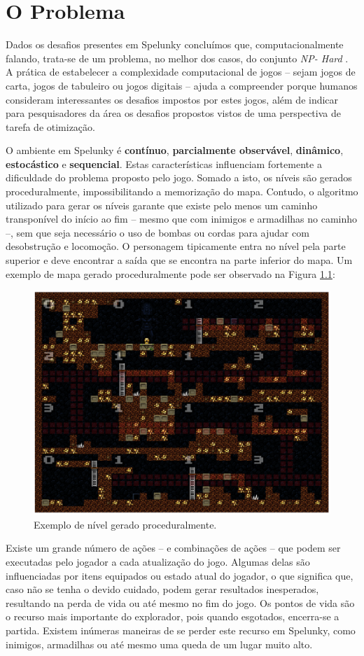 \chapter{\label{chap:problem}O Problema}
Dados os desafios presentes em Spelunky concluímos que, computacionalmente
falando, trata-se de um problema, no melhor dos casos, do conjunto \textit{NP-
Hard} \cite{SPELUNKYHARD}. A prática de estabelecer a complexidade computacional
de jogos -- sejam jogos de carta, jogos de tabuleiro ou jogos digitais -- ajuda
a compreender  porque humanos consideram interessantes os desafios impostos por
estes jogos, além de indicar para pesquisadores da área os desafios propostos
vistos de uma perspectiva de tarefa de otimização.

O ambiente em Spelunky é \textbf{contínuo}, \textbf{parcialmente observável},
\textbf{dinâmico}, \textbf{estocástico} e \textbf{sequencial}. Estas
características influenciam fortemente a dificuldade do problema proposto pelo
jogo. Somado a isto, os níveis são gerados proceduralmente, impossibilitando a
memorização do mapa. Contudo, o algoritmo utilizado para gerar os níveis garante
que existe pelo menos um caminho transponível do início ao fim -- mesmo que com
inimigos e armadilhas no caminho --, sem que seja necessário o uso de bombas ou
cordas para ajudar com desobstrução e locomoção. O personagem tipicamente entra
no nível pela parte superior e deve encontrar a saída que se encontra na parte
inferior do mapa. Um exemplo de mapa gerado proceduralmente pode ser observado
na Figura \ref{fig:spelunky-level-example}:

\begin{figure}[htb!]
\centering\includegraphics[width=.65\textwidth]{fig/spelunky-level-example.png}
\caption {\label{fig:spelunky-level-example}Exemplo de nível gerado
proceduralmente.} \end{figure}

Existe um grande número de ações -- e combinações de ações -- que podem ser
executadas pelo jogador a cada atualização do jogo. Algumas delas são
influenciadas por itens equipados ou estado atual do jogador, o que significa
que, caso não se tenha o devido cuidado, podem gerar resultados inesperados,
resultando na perda de vida ou até mesmo no fim do jogo. Os pontos de vida são o
recurso mais importante do explorador, pois quando esgotados, encerra-se a
partida. Existem inúmeras maneiras de se perder este recurso em Spelunky, como
inimigos, armadilhas ou até mesmo uma queda de um lugar muito alto.

